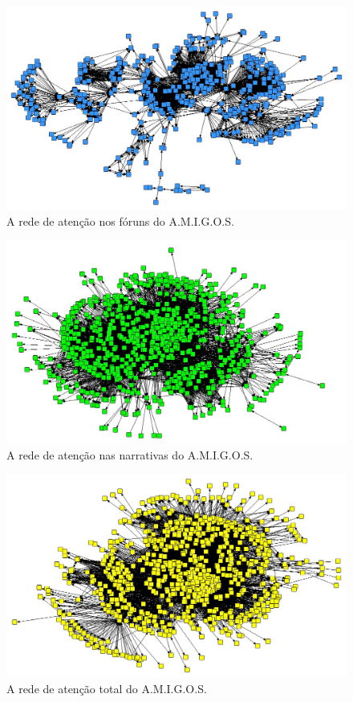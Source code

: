 \documentclass{article}
\begin{document}
\begin{figure}[h!]
  \caption{A rede de atenção nos fóruns do A.M.I.G.O.S.}
  \centering
    \includegraphics[width=\textwidth]{imgs/amigos-topicos.jpg}
\end{figure}

\begin{figure}[h!]
  \caption{A rede de atenção nas narrativas do A.M.I.G.O.S.}
  \centering
    \includegraphics[width=\textwidth]{imgs/amigos-narrativas.jpg}
\end{figure}

\begin{figure}[h!]
  \caption{A rede de atenção total do A.M.I.G.O.S.}
  \centering
    \includegraphics[width=\textwidth]{imgs/amigos-atencao.jpg}
\end{figure}
\end{document}
